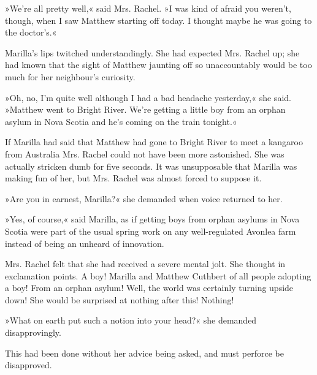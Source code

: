 »We’re all pretty well,« said Mrs. Rachel. »I was kind of afraid you weren’t, though, when I saw Matthew starting off today. I thought maybe he was going to the doctor’s.«

Marilla’s lips twitched understandingly. She had expected Mrs. Rachel up; she had known that the sight of Matthew jaunting off so unaccountably would be too much for her neighbour's curiosity.

»Oh, no, I’m quite well although I had a bad headache yesterday,« she said. »Matthew went to Bright River. We’re getting a little boy from an orphan asylum in Nova Scotia and he’s coming on the train tonight.«

If Marilla had said that Matthew had gone to Bright River to meet a kangaroo from Australia Mrs. Rachel could not have been more astonished. She was actually stricken dumb for five seconds. It was unsupposable that Marilla was making fun of her, but Mrs. Rachel was almost forced to suppose it.

»Are you in earnest, Marilla?« she demanded when voice returned to her.

»Yes, of course,« said Marilla, as if getting boys from orphan asylums in Nova Scotia were part of the usual spring work on any well-regulated Avonlea farm instead of being an unheard of innovation.

Mrs. Rachel felt that she had received a severe mental jolt. She thought in exclamation points. A boy! Marilla and Matthew Cuthbert of all people adopting a boy! From an orphan asylum! Well, the world was certainly turning upside down! She would be surprised at nothing after this! Nothing!

»What on earth put such a notion into your head?« she demanded disapprovingly.

This had been done without her advice being asked, and must perforce be disapproved.

